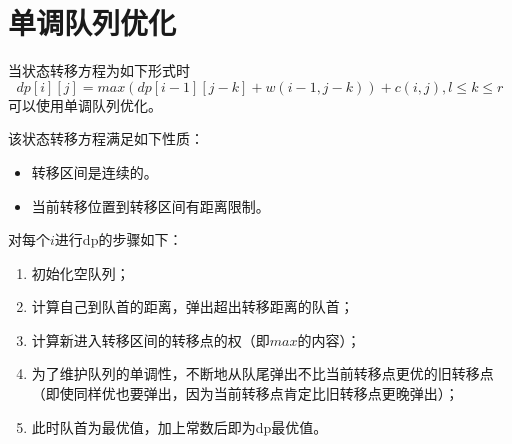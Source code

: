 \section{单调队列优化}
当状态转移方程为如下形式时
\begin{displaymath}
    dp[i][j]=max(dp[i-1][j-k]+w(i-1,j-k))+c(i,j),l \leq k \leq r
\end{displaymath}
可以使用单调队列优化。

该状态转移方程满足如下性质：
\begin{itemize}
	\item 转移区间是连续的。
	\item 当前转移位置到转移区间有距离限制。
\end{itemize}

对每个$i$进行dp的步骤如下：
\begin{enumerate}
	\item 初始化空队列；
	\item 计算自己到队首的距离，弹出超出转移距离的队首；
	\item 计算新进入转移区间的转移点的权（即$max$的内容）；
	\item 为了维护队列的单调性，不断地从队尾弹出不比当前转移点更优的旧转移点
	      （即使同样优也要弹出，因为当前转移点肯定比旧转移点更晚弹出）；
	\item 此时队首为最优值，加上常数后即为dp最优值。
\end{enumerate}
